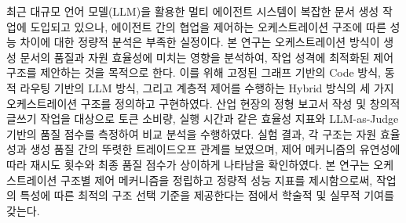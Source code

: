 최근 대규모 언어 모델(LLM)을 활용한 멀티 에이전트 시스템이 복잡한 문서 생성 작업에 도입되고 있으나, 에이전트 간의 협업을 제어하는 오케스트레이션 구조에 따른 성능 차이에 대한 정량적 분석은 부족한 실정이다. 본 연구는 오케스트레이션 방식이 생성 문서의 품질과 자원 효율성에 미치는 영향을 분석하여, 작업 성격에 최적화된 제어 구조를 제안하는 것을 목적으로 한다. 이를 위해 고정된 그래프 기반의 Code 방식, 동적 라우팅 기반의 LLM 방식, 그리고 계층적 제어를 수행하는 Hybrid 방식의 세 가지 오케스트레이션 구조를 정의하고 구현하였다. 산업 현장의 정형 보고서 작성 및 창의적 글쓰기 작업을 대상으로 토큰 소비량, 실행 시간과 같은 효율성 지표와 LLM-as-Judge 기반의 품질 점수를 측정하여 비교 분석을 수행하였다. 실험 결과, 각 구조는 자원 효율성과 생성 품질 간의 뚜렷한 트레이드오프 관계를 보였으며, 제어 메커니즘의 유연성에 따라 재시도 횟수와 최종 품질 점수가 상이하게 나타남을 확인하였다. 본 연구는 오케스트레이션 구조별 제어 메커니즘을 정립하고 정량적 성능 지표를 제시함으로써, 작업의 특성에 따른 최적의 구조 선택 기준을 제공한다는 점에서 학술적 및 실무적 기여를 갖는다.